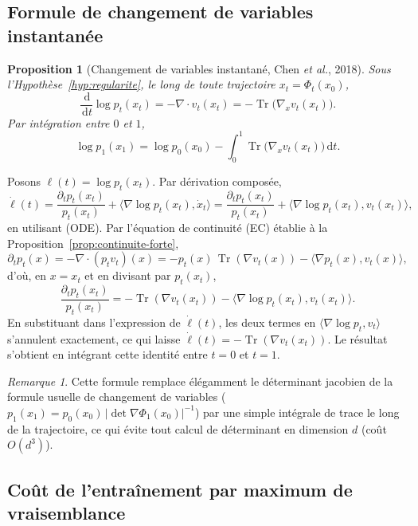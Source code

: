 \documentclass[11pt,a4paper]{article}
\makeatletter
\theoremstyle{definition}
\theoremstyle{plain}
\newtheorem{proposition}{Proposition}[section]
\theoremstyle{remark}
\newtheorem{remark}{Remarque}[section]
\providecommand{\demonstrationname}{Démonstration}
\renewenvironment{proof}[1][\demonstrationname]{\par
  \pushQED{\qed}%
  \normalfont \topsep6\p@\@plus6\p@\relax
  \trivlist
  \item[\hskip\labelsep
        \bfseries #1\@addpunct{.}]\ignorespaces
}{%
  \popQED\endtrivlist\@endpefalse
}
\newcommand{\dd}{\,\mathrm{d}}
\DeclareMathOperator{\Tr}{Tr}
\makeatother
\begin{document}
\subsection{Formule de changement de variables instantanée}

\begin{proposition}[Changement de variables instantané, {Chen \emph{et al.}, 2018}]\label{prop:instant-cov}
Sous l'Hypothèse~\ref{hyp:regularite}, le long de toute trajectoire
$x_t=\Phi_t(x_0)$,
\[
  \boxed{
  \frac{\dd}{\dd t}\log p_t(x_t) = -\nabla\cdot v_t(x_t) = -\Tr\bigl(\nabla_x v_t(x_t)\bigr).
  }
\]
Par intégration entre $0$ et $1$,
\[
  \log p_1(x_1) = \log p_0(x_0) - \int_0^1 \Tr\bigl(\nabla_x v_t(x_t)\bigr)\dd t.
\]
\end{proposition}

\begin{proof}
Posons $\ell(t)=\log p_t(x_t)$. Par dérivation composée,
\[
  \dot\ell(t)
  =
  \frac{\partial_t p_t(x_t)}{p_t(x_t)}
  +
  \bigl\langle \nabla\log p_t(x_t),\dot x_t\bigr\rangle
  =
  \frac{\partial_t p_t(x_t)}{p_t(x_t)}
  +
  \bigl\langle \nabla\log p_t(x_t),v_t(x_t)\bigr\rangle,
\]
en utilisant (ODE). Par l'équation de continuité (EC) établie à la
Proposition~\ref{prop:continuite-forte},
\[
  \partial_t p_t(x) = -\nabla\cdot(p_tv_t)(x) = -p_t(x)\,\Tr(\nabla v_t(x)) - \bigl\langle \nabla p_t(x),v_t(x)\bigr\rangle,
\]
d'où, en $x=x_t$ et en divisant par $p_t(x_t)$,
\[
  \frac{\partial_t p_t(x_t)}{p_t(x_t)} = -\Tr(\nabla v_t(x_t)) - \bigl\langle \nabla\log p_t(x_t),v_t(x_t)\bigr\rangle.
\]
En substituant dans l'expression de $\dot\ell(t)$, les deux termes en
$\langle\nabla\log p_t,v_t\rangle$ s'annulent exactement, ce qui laisse
$\dot\ell(t)=-\Tr(\nabla v_t(x_t))$. Le résultat s'obtient en intégrant cette
identité entre $t=0$ et $t=1$.
\end{proof}

\begin{remark}
Cette formule remplace élégamment le déterminant jacobien de la formule usuelle
de changement de variables ($p_1(x_1)=p_0(x_0)\,|\det\nabla\Phi_1(x_0)|^{-1}$)
par une simple intégrale de trace le long de la trajectoire, ce qui évite tout
calcul de déterminant en dimension $d$ (coût $O(d^3)$).
\end{remark}

\subsection{Coût de l'entraînement par maximum de vraisemblance}
\end{document}
